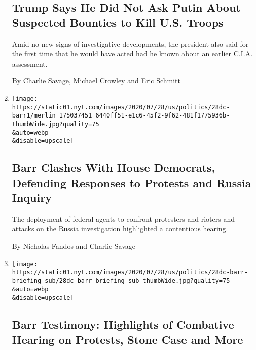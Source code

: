 \begin{enumerate}
  \hypertarget{trump-says-he-did-not-ask-putin-about-suspected-bounties-to-kill-us-troops}{%
  \subsection{Trump Says He Did Not Ask Putin About Suspected Bounties
  to Kill U.S.
  Troops}\label{trump-says-he-did-not-ask-putin-about-suspected-bounties-to-kill-us-troops}}

  Amid no new signs of investigative developments, the president also
  said for the first time that he would have acted had he known about an
  earlier C.I.A. assessment.

  By Charlie Savage, Michael Crowley and Eric Schmitt
\item
  \href{/2020/07/28/us/politics/barr-testimony.html}{}

  \texttt{[image: https://static01.nyt.com/images/2020/07/28/us/politics/28dc-barr1/merlin\_175037451\_6440ff51-e1c6-45f2-9f62-481f1775936b-thumbWide.jpg?quality=75\\\&auto=webp\\\&disable=upscale]}

  \hypertarget{barr-clashes-with-house-democrats-defending-responses-to-protests-and-russia-inquiry}{%
  \subsection{Barr Clashes With House Democrats, Defending Responses to
  Protests and Russia
  Inquiry}\label{barr-clashes-with-house-democrats-defending-responses-to-protests-and-russia-inquiry}}

  The deployment of federal agents to confront protesters and rioters
  and attacks on the Russia investigation highlighted a contentious
  hearing.

  By Nicholas Fandos and Charlie Savage
\item
  \href{/2020/07/28/us/politics/william-barr-house-judiciary-hearing.html}{}

  \texttt{[image: https://static01.nyt.com/images/2020/07/28/us/politics/28dc-barr-briefing-sub/28dc-barr-briefing-sub-thumbWide.jpg?quality=75\\\&auto=webp\\\&disable=upscale]}

  \hypertarget{barr-testimony-highlights-of-combative-hearing-on-protests-stone-case-and-more}{%
  \subsection{Barr Testimony: Highlights of Combative Hearing on
  Protests, Stone Case and
  More}\label{barr-testimony-highlights-of-combative-hearing-on-protests-stone-case-and-more}}


\end{enumerate}
